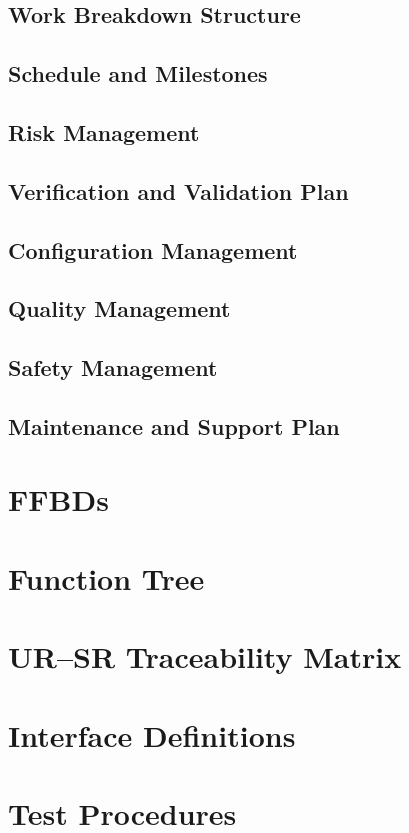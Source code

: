 \documentclass[a4paper,10pt]{article}
\begin{document}
\subsection{Work Breakdown Structure}

\subsection{Schedule and Milestones}

\subsection{Risk Management}

\subsection{Verification and Validation Plan}

\subsection{Configuration Management}

\subsection{Quality Management}

\subsection{Safety Management}

\subsection{Maintenance and Support Plan}

\newpage

\printbibliography

\newpage

\appendix

\section{FFBDs}

\section{Function Tree}

\section{UR--SR Traceability Matrix}

\section{Interface Definitions}

\section{Test Procedures}
\end{document}
